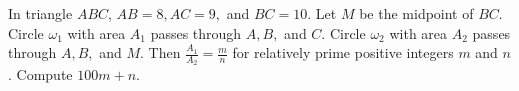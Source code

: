 In triangle $ABC$, $AB=8, AC=9,$ and $BC=10$. Let $M$ be the midpoint of $BC$. Circle $\omega_1$ with area $A_1$ passes through $A,B,$ and $C$. Circle $\omega_2$ with area $A_2$ passes through $A,B,$ and $M$. Then $\frac{A_1}{A_2}=\frac{m}{n}$ for relatively prime positive integers $m$ and $n$. Compute $100m+n$.
